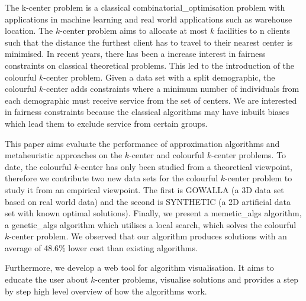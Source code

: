 The k-center problem is a classical \gls{combinatorial_optimisation} problem with applications in machine learning and real world applications such as warehouse location. The $k$-center problem aims to allocate at most $k$ facilities to n clients such that the distance the furthest client has to travel to their nearest center is minimised. In recent years, there has been a increase interest in fairness constraints on classical theoretical problems. This led to the introduction of the colourful $k$-center problem. Given a data set with a split demographic, the colourful $k$-center adds constraints where a minimum number of individuals from each demographic must receive service from the set of centers. We are interested in fairness constraints because the classical algorithms may have inbuilt biases which lead them to exclude service from certain groups.

This paper aims evaluate the performance of approximation algorithms and metaheuristic approaches on the $k$-center and colourful $k$-center problems. To date, the colourful $k$-center has only been studied from a theoretical viewpoint, therefore we contribute two new data sets for the colourful $k$-center problem to study it from an empirical viewpoint. The first is GOWALLA (a 3D data set based on real world data) and the second is SYNTHETIC (a 2D artificial data set with known optimal solutions). Finally, we present a \gls{memetic_algs} algorithm, a \gls{genetic_algs} algorithm which utilises a local search, which solves the colourful $k$-center problem. We observed that our algorithm produces solutions with an average of 48.6\% lower cost than existing algorithms.

Furthermore, we develop a web tool for algorithm visualisation. It aims to educate the user about $k$-center problems, visualise solutions and provides a step by step high level overview of how the algorithms work.